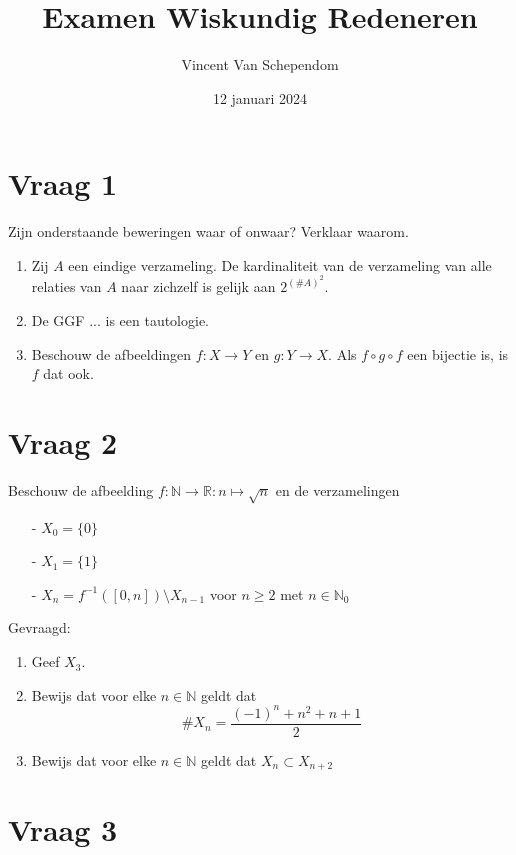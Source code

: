\documentclass[kulak]{kulakarticle} %
\title{Examen Wiskundig Redeneren}
\author{Vincent Van Schependom}
\date{12 januari 2024}
\begin{document}
	\maketitle

	\section*{Vraag 1}

	Zijn onderstaande beweringen waar of onwaar? Verklaar waarom.

	\begin{enumerate}
		\item Zij \(A\) een eindige verzameling. De kardinaliteit van de verzameling van alle relaties van \(A\) naar zichzelf is gelijk aan \(2^{(\#A)^2}\).
		\item De GGF ... is een tautologie.
		\item Beschouw de afbeeldingen \(f:X\rightarrow Y\) en \(g:Y \rightarrow X\). Als \(f\circ g \circ f\) een bijectie is, is \(f\) dat ook.
	\end{enumerate}

	\section*{Vraag 2}

	Beschouw de afbeelding \(f:\mathbb{N}\rightarrow\mathbb{R}:n\mapsto\sqrt{n}\) en de verzamelingen
	\begin{itemize}
		\item[-] \(X_0=\{0\}\)
		\item[-] \(X_1=\{1\}\)
		\item[-] \(X_n=f^{-1}([0,n])\setminus X_{n-1}\) \hspace{1cm} voor \(n\geq2\) met \(n\in \mathbb{N}_0\)
	\end{itemize}

	\noindent Gevraagd:

	\begin{enumerate}
		\item Geef \(X_3\).
		\item Bewijs dat voor elke \(n \in \mathbb{N}\) geldt dat \[\#X_n=\frac{(-1)^n+n^2+n+1}{2}\]
		\item Bewijs dat voor elke \(n \in \mathbb{N}\) geldt dat \(X_{n}\subset X_{n+2}\)
	\end{enumerate}

	\section*{Vraag 3}
\end{document}
